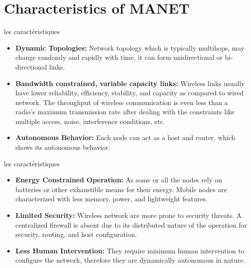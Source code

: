 \documentclass[11pt]{beamer}
\begin{document}
\section{Characteristics of MANET }
\begin{frame}{les caractéristiques}
\begin{itemize}
\item \textbf{Dynamic Topologies:} Network topology which is typically multihops, may change randomly and rapidly with time, it can form unidirectional or bi-directional links.
\item \textbf{Bandwidth constrained, variable capacity links:} Wireless links usually have lower reliability, efficiency, stability, and capacity as compared to wired network. The throughput of wireless communication is even less than a radio’s maximum transmission rate after dealing with the constraints like multiple access, noise, interference conditions, etc.
\item \textbf{Autonomous Behavior:} Each node can act as a host and router, which shows its autonomous behavior.
\end{itemize}
\end{frame}
\begin{frame}{les caractéristiques}
\begin{itemize}
\item \textbf{Energy Constrained Operation:} As some or all the nodes rely on batteries or other exhaustible means for their energy. Mobile nodes are characterized with less memory, power, and lightweight features.
\item \textbf{Limited Security:} Wireless network are more prone to security threats. A centralized firewall is absent due to its distributed nature of the operation for security, routing, and host configuration.
\item \textbf{Less Human Intervention: }They require minimum human intervention to configure the network, therefore they are dynamically autonomous in nature.
\end{itemize}
\end{frame}
\end{document}
